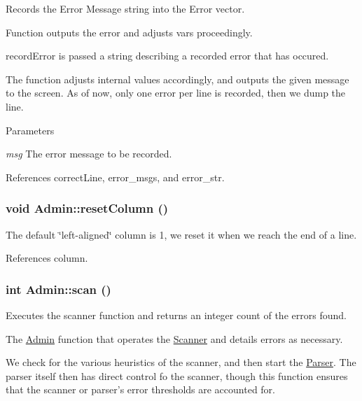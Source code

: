 Records the Error Message string into the Error vector. 

Function outputs the error and adjusts vars proceedingly.

recordError is passed a string describing a recorded error that has occured.

The function adjusts internal values accordingly, and outputs the given message to the screen. As of now, only one error per line is recorded, then we dump the line.


\begin{DoxyParams}{Parameters}
\item[{\em msg}]The error message to be recorded. \end{DoxyParams}


References correctLine, error\_\-msgs, and error\_\-str.

\hypertarget{classAdmin_a62813e5c17636eeef43524ad40cdaab8}{
\subsubsection[{resetColumn}]{\setlength{\rightskip}{0pt plus 5cm}void Admin::resetColumn ()}}
\label{classAdmin_a62813e5c17636eeef43524ad40cdaab8}


The default \char`\"{}left-\/aligned\char`\"{} column is 1, we reset it when we reach the end of a line. 



References column.

\hypertarget{classAdmin_aaa4f711e8151dceab8d90c5f127c6820}{
\subsubsection[{scan}]{\setlength{\rightskip}{0pt plus 5cm}int Admin::scan ()}}
\label{classAdmin_aaa4f711e8151dceab8d90c5f127c6820}


Executes the scanner function and returns an integer count of the errors found. 

The \hyperlink{classAdmin}{Admin} function that operates the \hyperlink{classScanner}{Scanner} and details errors as necessary.

We check for the various heuristics of the scanner, and then start the \hyperlink{classParser}{Parser}. The parser itself then has direct control fo the scanner, though this function ensures that the scanner or parser's error thresholds are accounted for.

